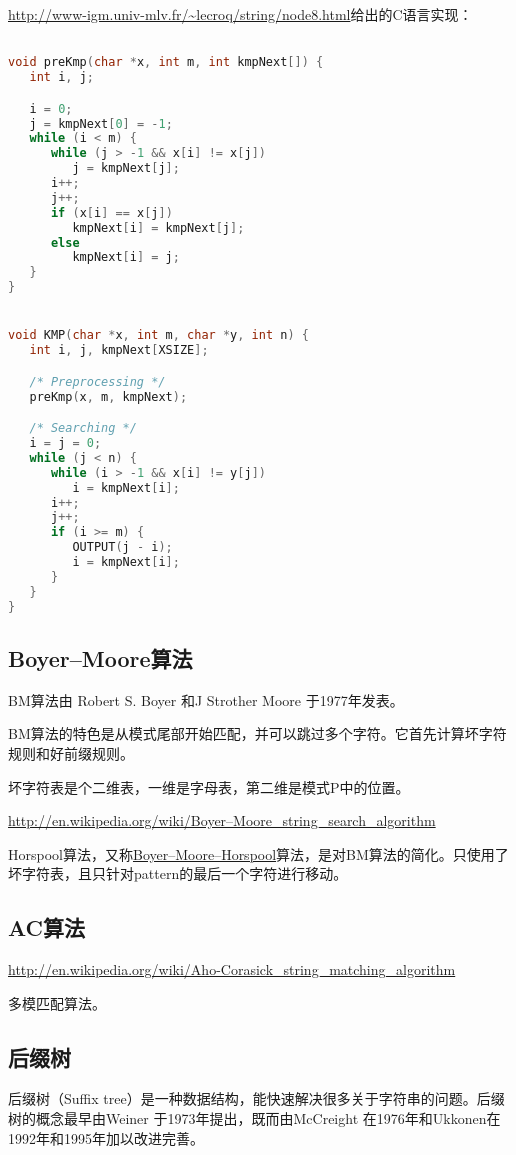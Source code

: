 \url{http://www-igm.univ-mlv.fr/~lecroq/string/node8.html}给出的C语言实现：
\begin{lstlisting}[language=C++]

void preKmp(char *x, int m, int kmpNext[]) {
   int i, j;

   i = 0;
   j = kmpNext[0] = -1;
   while (i < m) {
      while (j > -1 && x[i] != x[j])
         j = kmpNext[j];
      i++;
      j++;
      if (x[i] == x[j])
         kmpNext[i] = kmpNext[j];
      else
         kmpNext[i] = j;
   }
}


void KMP(char *x, int m, char *y, int n) {
   int i, j, kmpNext[XSIZE];

   /* Preprocessing */
   preKmp(x, m, kmpNext);

   /* Searching */
   i = j = 0;
   while (j < n) {
      while (i > -1 && x[i] != y[j])
         i = kmpNext[i];
      i++;
      j++;
      if (i >= m) {
         OUTPUT(j - i);
         i = kmpNext[i];
      }
   }
}
\end{lstlisting}


\subsection{Boyer–Moore算法}
BM算法由 Robert S. Boyer 和J Strother Moore 于1977年发表。

BM算法的特色是从模式尾部开始匹配，并可以跳过多个字符。它首先计算坏字符规则和好前缀规则。

坏字符表是个二维表，一维是字母表，第二维是模式P中的位置。

\url{http://en.wikipedia.org/wiki/Boyer–Moore_string_search_algorithm}

Horspool算法，又称\href{https://en.wikipedia.org/wiki/Boyer%E2%80%93Moore%E2%80%93Horspool_algorithm}{Boyer–Moore–Horspool}算法，是对BM算法的简化。只使用了坏字符表，且只针对pattern的最后一个字符进行移动。


\subsection{AC算法}
\url{http://en.wikipedia.org/wiki/Aho-Corasick_string_matching_algorithm}

多模匹配算法。

\subsection{后缀树}
后缀树（Suffix tree）是一种数据结构，能快速解决很多关于字符串的问题。后缀树的概念最早由Weiner 于1973年提出，既而由McCreight 在1976年和Ukkonen在1992年和1995年加以改进完善。

